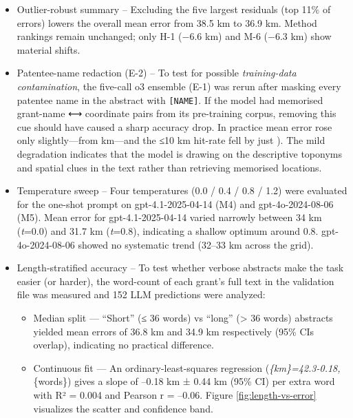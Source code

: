 \begin{itemize}
\item
  Outlier-robust summary -- Excluding the five largest residuals (top
  11\% of errors) lowers the overall mean error from 38.5 km to 36.9 km.
  Method rankings \DIFdelbegin {}\DIFdelend remain unchanged; only H-1 \citep{Bashorun2025_gis}
  (−6.6 km) and M-6 (−6.3 km) show material shifts\DIFdelbegin {}\DIFdelend .
\item
  Patentee-name redaction (E-2) -- To test for possible
  \emph{training-data contamination}, the five-call o3 ensemble (E-1)
  was rerun after masking every patentee name in the abstract with
  \passthrough{\lstinline![NAME]!}. If the model had memorised
  grant-name ⟷ coordinate pairs from its pre-training corpus, removing
  this cue should have caused a sharp accuracy drop. In practice mean
  error rose only slightly---from \DIFdelbegin {}\DIFdelend \DIFaddbegin {}\DIFaddend km---and the ≤10 km
  hit-rate fell by just \DIFdelbegin {}\DIFdelend \DIFaddbegin {} \DIFaddbegin {}\DIFaddend ). The mild degradation
  indicates that the model is drawing on the descriptive toponyms and
  spatial clues in the text rather than retrieving memorised locations\DIFdelbegin {}\DIFdelend .
\item
  Temperature sweep -- Four temperatures (0.0 / 0.4 / 0.8 / 1.2) were
  evaluated for the one-shot prompt on gpt-4.1-2025-04-14 (M4) and
  gpt-4o-2024-08-06 (M5). Mean error for gpt-4.1-2025-04-14 varied
  narrowly between 34 km (\emph{t}=0.0) and 31.7 km (\emph{t}=0.8),
  indicating a shallow optimum around 0.8. gpt-4o-2024-08-06 showed no
  systematic trend (32--33 km across the grid).
\item
  Length‐stratified accuracy -- To test whether verbose abstracts make
  the task easier (or harder), the word-count of each grant's full text
  in the validation file was measured and 152 LLM predictions were
  analyzed:

  \begin{itemize}
  \tightlist
  \item
    Median split --- ``Short'' (≤ 36 words) vs ``long'' (\textgreater{}
    36 words) abstracts yielded mean errors of 36.8 km and 34.9 km
    respectively (95\% CIs overlap), indicating no practical
    difference.\\
  \item
    Continuous fit --- An ordinary-least-squares regression
    (\emph{\{km\}=42.3-0.18,}\{words\}) gives a
    slope of --0.18 km ± 0.44 km (95\% CI) per extra word with R² =
    0.004 and Pearson r = --0.06. Figure \ref{fig:length-vs-error}
    visualizes the scatter and confidence band.
  \end{itemize}
\end{itemize}

